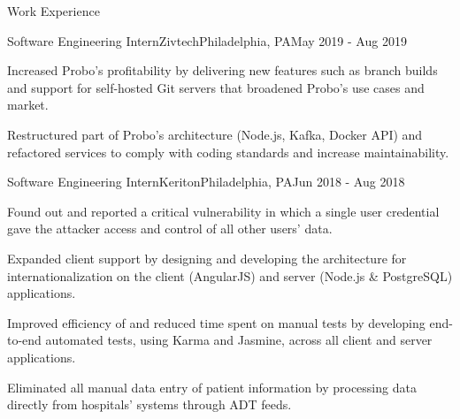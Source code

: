 \documentclass{resume} %
\begin{document}
\begin{rSection}{Work Experience}

\begin{rSubsection}{Software Engineering Intern}{Zivtech}{Philadelphia, PA}{May 2019 - Aug 2019}
\item Increased Probo's profitability by delivering new features such as branch builds and support for self-hosted Git servers that broadened Probo's use cases and market.
\item Restructured part of Probo's architecture (Node.js, Kafka, Docker API) and refactored services to comply with coding standards and increase maintainability.
\end{rSubsection}


\begin{rSubsection}{Software Engineering Intern}{Keriton}{Philadelphia, PA}{Jun 2018 - Aug 2018}
\item Found out and reported a critical vulnerability in which a single user credential gave the attacker access and control of all other users' data.
\item Expanded client support by designing and developing the architecture for internationalization on the client (AngularJS) and server (Node.js \& PostgreSQL) applications.
\item Improved efficiency of and reduced time spent on manual tests by developing end-to-end automated tests, using Karma and Jasmine, across all client and server applications.
\item Eliminated all manual data entry of patient information by processing data directly from hospitals' systems through ADT feeds.
\end{rSubsection}

\end{rSection}

\end{document}
